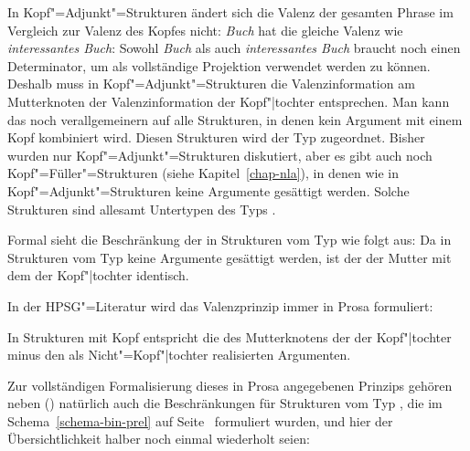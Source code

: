 In Kopf"=Adjunkt"=Strukturen ändert sich die Valenz der gesamten Phrase im Vergleich
zur Valenz des Kopfes nicht: \emph{Buch} hat die gleiche Valenz wie \emph{interessantes Buch}:
Sowohl \emph{Buch} als auch \emph{interessantes Buch} braucht noch einen Determinator, um als
vollständige Projektion verwendet werden zu können.
Deshalb muss in Kopf"=Adjunkt"=Strukturen die Valenzinformation am Mutterknoten der Valenzinformation 
der Kopf"|tochter entsprechen. Man kann das noch verallgemeinern auf alle Strukturen, in denen
kein Argument mit einem Kopf kombiniert wird. Diesen Strukturen wird der Typ 
zugeordnet. Bisher wurden nur Kopf"=Adjunkt"=Strukturen diskutiert, aber es gibt \zb auch
noch Kopf"=Füller"=Strukturen (siehe Kapitel~\ref{chap-nla}), in denen wie in Kopf"=Adjunkt"=Strukturen
keine Argumente gesättigt werden. Solche Strukturen sind allesamt Untertypen des Typs .

Formal sieht die Beschränkung der \subcatwe in Strukturen vom Typ 
wie folgt aus:
\ea
\label{def-head-non-arg-phrase}
 \impl
{}
\z
Da in Strukturen vom Typ 
keine Argumente gesättigt werden, ist der \subcatw der Mutter mit dem der Kopf"|tochter identisch.

In der HPSG"=Literatur wird das Valenzprinzip immer in Prosa formuliert:

\begin{prinzip-break}[Valenzprinzip]
In Strukturen mit Kopf entspricht die \subcatl des Mutterknotens der \subcatl der Kopf"|tochter
minus den als Nicht"=Kopf"|tochter realisierten Argumenten.
\end{prinzip-break}

\noindent
Zur vollständigen Formalisierung dieses in Prosa angegebenen Prinzips gehören neben ()
natürlich auch die Beschränkungen für Strukturen vom Typ , die im
Schema~\ref{schema-bin-prel} auf Seite~\pageref{schema-bin-prel} formuliert wurden, und hier der
Übersichtlichkeit halber noch einmal wiederholt seien:
\ea
{} \impl\\
\z

